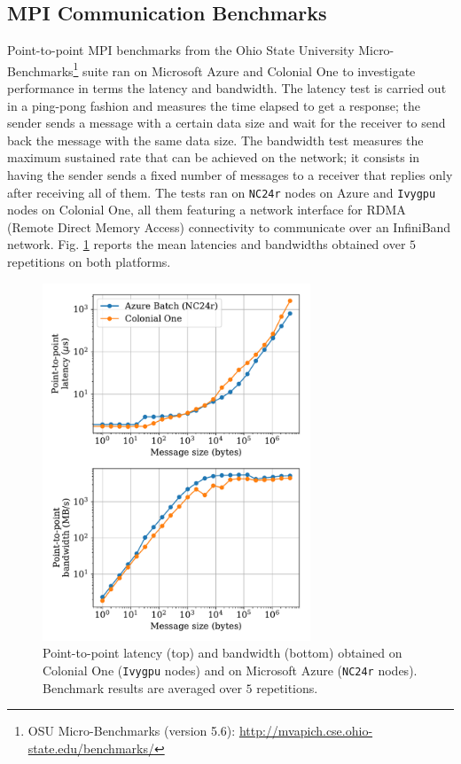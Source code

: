\documentclass[10pt,journal,compsoc]{IEEEtran}
\begin{document}
\subsection{MPI Communication Benchmarks}\label{subsec:mpi_benchmarks}

Point-to-point MPI benchmarks from the Ohio State University Micro-Benchmarks\footnote{OSU Micro-Benchmarks (version 5.6): \url{http://mvapich.cse.ohio-state.edu/benchmarks/}} suite ran on Microsoft Azure and Colonial One to investigate performance in terms the latency and bandwidth.
The latency test is carried out in a ping-pong fashion and measures the time elapsed to get a response; the sender sends a message with a certain data size and wait for the receiver to send back the message with the same data size.
The bandwidth test measures the maximum sustained rate that can be achieved on the network; it consists in having the sender sends a fixed number of messages to a receiver that replies only after receiving all of them.
The tests ran on \texttt{NC24r} nodes on Azure and \texttt{Ivygpu} nodes on Colonial One, all them featuring a network interface for RDMA (Remote Direct Memory Access) connectivity to communicate over an InfiniBand network.
Fig. \ref{fig:osu_benchmarks} reports the mean latencies and bandwidths obtained over $5$ repetitions on both platforms.

\begin{figure}[!h]
    \centering
    \includegraphics[width=8cm]{figures/osu_latency_bandwidth.pdf}
    \caption{Point-to-point latency (top) and bandwidth (bottom) obtained on Colonial One (\texttt{Ivygpu} nodes) and on Microsoft Azure (\texttt{NC24r} nodes). Benchmark results are averaged over $5$ repetitions.}
    \label{fig:osu_benchmarks}
\end{figure}
\end{document}
